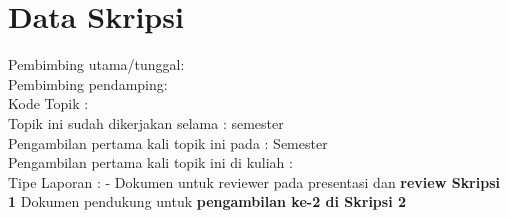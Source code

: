 \documentclass[a4paper,twoside]{article}
\begin{document}

\section{Data Skripsi} %
Pembimbing utama/tunggal: {\bf \pembA}\\
Pembimbing pendamping: {\bf \pembB}\\
Kode Topik : {\bf \kodetopik}\\
Topik ini sudah dikerjakan selama : {\bf \lamaSkripsi} semester\\
Pengambilan pertama kali topik ini pada : Semester {\bf \semesterPertama} \\
Pengambilan pertama kali topik ini di kuliah : {\bf \kulPertama} \\
Tipe Laporan : {\bf \tipePR} -
		{
		 {
				Dokumen untuk reviewer pada presentasi dan {\bf review Skripsi 1}}
			{	Dokumen pendukung untuk {\bf pengambilan ke-2 di Skripsi 2}}
		}
		
\end{document}
